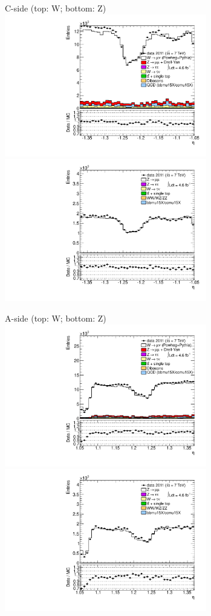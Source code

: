 {

\colb[T]

C-side (top: W; bottom: Z)
\centering
\includegraphics[width=0.66\textwidth]{dates/20130306/figures/etaphi/W_6_C_stack_l_eta_NEG} \\
\includegraphics[width=0.66\textwidth]{dates/20130306/figures/etaphi/Z_6_C_stack_lN_eta_ALL.pdf}

A-side (top: W; bottom: Z)
\centering
\includegraphics[width=0.66\textwidth]{dates/20130306/figures/etaphi/W_6_A_stack_l_eta_NEG} \\
\includegraphics[width=0.66\textwidth]{dates/20130306/figures/etaphi/Z_6_A_stack_lN_eta_ALL.pdf} 

\cole
}


